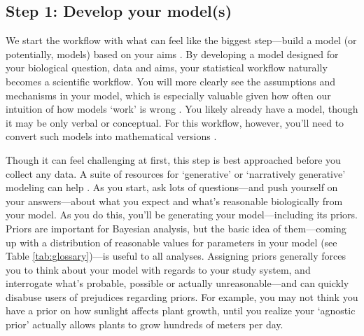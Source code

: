 \documentclass[11pt]{article}
\begin{document}
\subsection*{Step 1: Develop your model(s)} 

We start the workflow with what can feel like the biggest step---build a model (or potentially, models) based on your aims \citep{hilborn2013ecological}. By developing a model designed for your biological question, data and aims, your statistical workflow naturally becomes a scientific workflow. You will more clearly see the assumptions and mechanisms in your model, which is especially valuable given how often our intuition of how models `work' is wrong \citep{kokko2005useful}. You likely already have a model, though it may be only verbal or conceptual. For this workflow, however, you’ll need to convert such models into mathematical versions \citep{servedio2014not}. %

Though it can feel challenging at first, this step is best approached before you collect any data. A suite of resources for `generative' or `narratively generative' modeling can help \citep{statrethink,betangen}. %
As you start, ask lots of questions---and push yourself on your answers---about what you expect and what's reasonable biologically from your model. %
As you do this, you'll be generating your model---including its priors. Priors are important for Bayesian analysis, but the basic idea of them---coming up with a distribution of reasonable values for parameters in your model (see Table \ref{tab:glossary})---is useful to all analyses. Assigning priors generally forces you to think about your model with regards to your study system, and interrogate what's probable, possible or actually unreasonable---and can quickly disabuse users of prejudices regarding priors. For example, you may not think you have a prior on how sunlight affects plant growth, until you realize your `agnostic prior' actually allows plants to grow hundreds of meters per day. %
\end{document}
